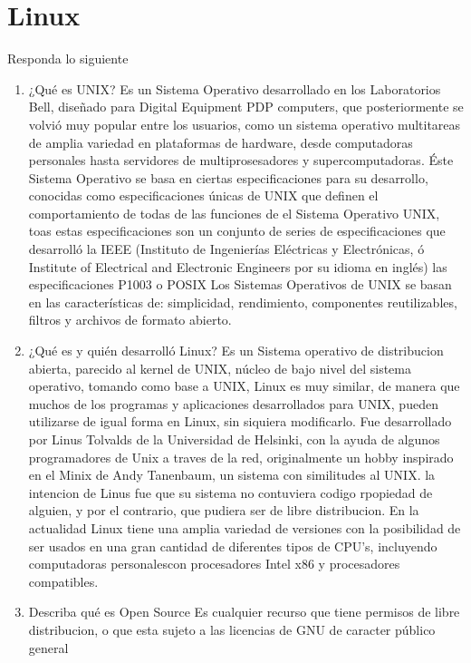 \section{Linux}

Responda lo siguiente

	\begin{enumerate}

			\item ¿Qué es UNIX? 
			Es un Sistema Operativo desarrollado en los Laboratorios Bell, diseñado para Digital Equipment PDP computers, que posteriormente se volvió muy popular entre los usuarios, como un sistema operativo multitareas de amplia variedad en plataformas de hardware, desde computadoras personales hasta servidores de multiprosesadores y supercomputadoras.
			Éste Sistema Operativo se basa en ciertas especificaciones para su desarrollo, conocidas como especificaciones únicas de UNIX que definen el comportamiento de todas de las funciones de el Sistema Operativo UNIX, toas estas especificaciones son un conjunto de series de especificaciones que desarrolló la IEEE (Instituto de Ingenierías Eléctricas y Electrónicas, ó Institute of Electrical and Electronic Engineers por su idioma en inglés) las especificaciones P1003 o POSIX
			Los Sistemas Operativos de UNIX se basan en las características de: simplicidad, rendimiento, componentes reutilizables, filtros y archivos de formato abierto. 
			\item ¿Qué es y quién desarrolló Linux?
			Es un Sistema operativo de distribucion abierta, parecido al kernel de UNIX, núcleo de bajo nivel del sistema operativo, tomando como base a UNIX, Linux es muy similar, de manera que muchos de los programas y aplicaciones desarrollados para UNIX, pueden utilizarse de igual forma en Linux, sin siquiera modificarlo.
			Fue desarrollado por Linus Tolvalds de la Universidad de Helsinki, con la ayuda de algunos programadores de Unix a traves de la red, originalmente un hobby inspirado en el Minix de Andy Tanenbaum, un sistema con similitudes al UNIX. la intencion de Linus fue que su sistema no contuviera codigo rpopiedad de alguien, y por el contrario, que pudiera ser de libre distribucion.
			En la actualidad Linux tiene una amplia variedad de versiones con la posibilidad de ser usados en una gran cantidad de diferentes tipos de CPU's, incluyendo computadoras personalescon procesadores Intel x86 y procesadores compatibles.
			\item Describa qué es Open Source
			Es cualquier recurso que tiene permisos de libre distribucion, o que esta sujeto a las licencias de GNU de caracter público general

\end{enumerate}
